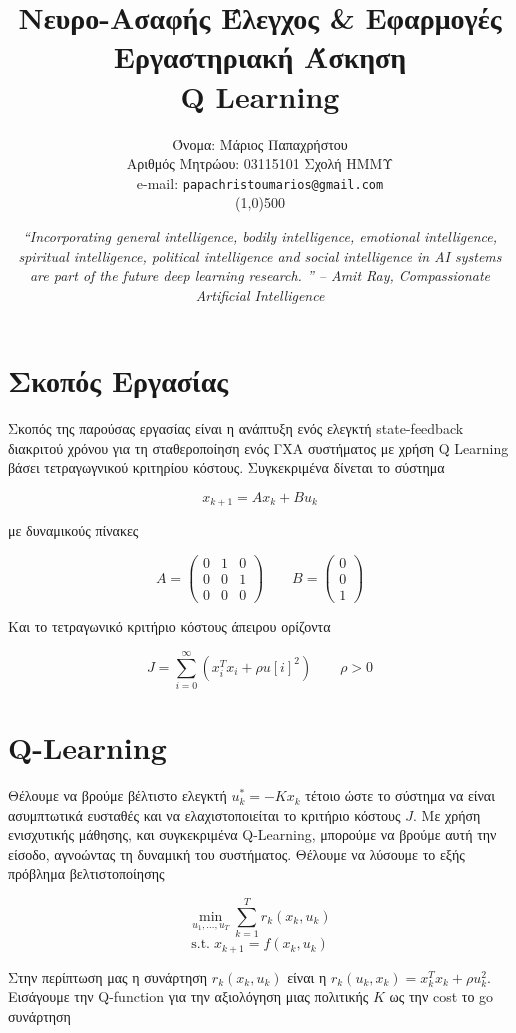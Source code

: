 \documentclass[a4paper,oneside,12pt]{article}
\title{ \textbf{Νευρο-Ασαφής Έλεγχος \& Εφαρμογές}  \\ Εργαστηριακή Άσκηση \\ Q Learning}
\author{Όνομα: Μάριος Παπαχρήστου \\ Αριθμός Μητρώου: 03115101 Σχολή ΗΜΜΥ \\ e-mail: \texttt{papachristoumarios@gmail.com}  \\ \line(1,0){500}}
\date{\emph{“Incorporating general intelligence, bodily intelligence, emotional intelligence, spiritual intelligence, political intelligence and social intelligence in AI systems are part of the future deep learning research. ” -- Amit Ray, Compassionate Artificial Intelligence}}
\begin{document}
\maketitle

\section{Σκοπός Εργασίας}

Σκοπός της παρούσας εργασίας είναι η ανάπτυξη ενός ελεγκτή state-feedback διακριτού χρόνου για τη σταθεροποίηση ενός ΓXA συστήματος με χρήση Q Learning βάσει τετραγωγνικού κριτηρίου κόστους. Συγκεκριμένα δίνεται το σύστημα 

$$x_{k+1} = A x_k + B u_k$$

με δυναμικούς πίνακες 

\begin{equation} \label{eq1}
A = \begin{pmatrix} 
	0 & 1 & 0 \\
	0 & 0 & 1 \\
	0 & 0 & 0
\end{pmatrix} \qquad
B = \begin{pmatrix}
	0 \\ 0 \\ 1 
\end{pmatrix}
\end{equation} 

Και το τετραγωνικό κριτήριο κόστους άπειρου ορίζοντα 

$$J = \sum_{i = 0}^\infty (x_i^T x_i + \rho u[i]^2) \qquad \rho > 0$$


\section{Q-Learning}

Θέλουμε να βρούμε βέλτιστο ελεγκτή $u^*_k = - K x_k$ τέτοιο ώστε το σύστημα να είναι ασυμπτωτικά ευσταθές και να ελαχιστοποιείται το κριτήριο κόστους $J$. Με χρήση ενισχυτικής μάθησης, και συγκεκριμένα Q-Learning, μπορούμε να βρούμε αυτή την είσοδο, αγνοώντας τη δυναμική του συστήματος. Θέλουμε να λύσουμε το εξής πρόβλημα βελτιστοποίησης

$$\min_{u_1, \dots, u_T} \sum_{k = 1}^T r_k(x_k, u_k)$$
$$\mathrm{s.t.}\; x_{k+1} = f(x_k, u_k)$$

Στην περίπτωση μας η συνάρτηση $r_k(x_k, u_k)$ είναι η $r_k(u_k, x_k) = x_k^Tx_k + \rho u_k^2$. Εισάγουμε την Q-function για την αξιολόγηση μιας πολιτικής $K$ ως την cost το go συνάρτηση 
\end{document}
